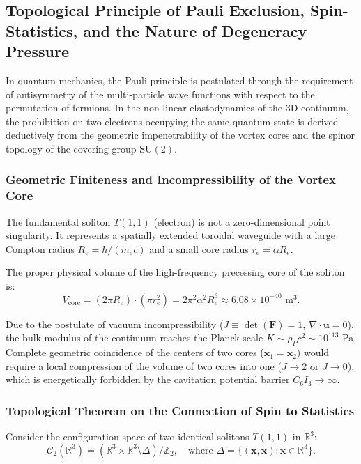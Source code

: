 \documentclass[12pt,a4paper]{article}
\begin{document}
	\subsection{Topological Principle of Pauli Exclusion, Spin-Statistics, and the Nature of Degeneracy Pressure}
								
	In quantum mechanics, the Pauli principle is postulated through the requirement of antisymmetry of the multi-particle wave functions with respect to the permutation of fermions. In the non-linear elastodynamics of the 3D continuum, the prohibition on two electrons occupying the same quantum state is derived deductively from the geometric impenetrability of the vortex cores and the spinor topology of the covering group $\mathrm{SU}(2)$.
								
	\subsubsection{Geometric Finiteness and Incompressibility of the Vortex Core}
	The fundamental soliton $T(1,1)$ (electron) is not a zero-dimensional point singularity. It represents a spatially extended toroidal waveguide with a large Compton radius $R_e = \hbar / (m_e c)$ and a small core radius $r_e = \alpha R_e$.
								
	The proper physical volume of the high-frequency precessing core of the soliton is:
	\begin{equation}
	V_{\text{core}} = (2\pi R_e) \cdot (\pi r_e^2) = 2\pi^2 \alpha^2 R_e^3 \approx 6.08 \times 10^{-40} \text{ m}^3.
	\end{equation}
								
	Due to the postulate of vacuum incompressibility ($J \equiv \det(\mathbf{F}) = 1, \ \nabla \cdot \mathbf{u} = 0$), the bulk modulus of the continuum reaches the Planck scale $K \sim \rho_P c^2 \sim 10^{113}$ Pa. Complete geometric coincidence of the centers of two cores ($\mathbf{x}_1 = \mathbf{x}_2$) would require a local compression of the volume of two cores into one ($J \to 2$ or $J \to 0$), which is energetically forbidden by the cavitation potential barrier $C_6 I_3 \to \infty$.
								
	\subsubsection{Topological Theorem on the Connection of Spin to Statistics}
	Consider the configuration space of two identical solitons $T(1,1)$ in $\mathbb{R}^3$:
	\begin{equation}
	\mathcal{C}_2(\mathbb{R}^3) = \left( \mathbb{R}^3 \times \mathbb{R}^3 \setminus \Delta \right) / \mathbb{Z}_2, \quad \text{where } \Delta = \{(\mathbf{x}, \mathbf{x}) : \mathbf{x} \in \mathbb{R}^3\}.
	\end{equation}
								
\end{document}
